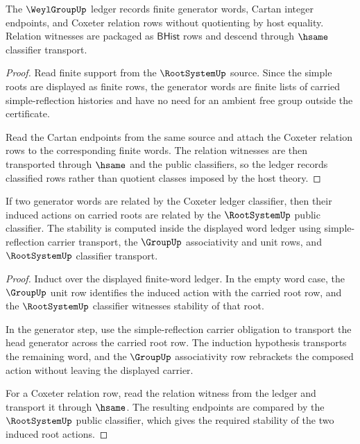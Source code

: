 \begin{theorem}
\label{thm:weylgroup-coxeter-ledger-obligation}
The $\WeylGroupUp$ ledger records finite generator words, Cartan integer
endpoints, and Coxeter relation rows without quotienting by host equality.
Relation witnesses are packaged as $\mathsf{BHist}$ rows and descend through
$\hsame$ classifier transport.
\end{theorem}
\begin{proof}
Read finite support from the $\RootSystemUp$ source. Since the simple roots
are displayed as finite rows, the generator words are finite lists of carried
simple-reflection histories and have no need for an ambient free group outside
the certificate.

Read the Cartan endpoints from the same source and attach the Coxeter relation
rows to the corresponding finite words. The relation witnesses are then
transported through $\hsame$ and the public classifiers, so the ledger records
classified rows rather than quotient classes imposed by the host theory.
\end{proof}

\begin{theorem}
\label{thm:weylgroup-action-classifier-stability-obligation}
If two generator words are related by the Coxeter ledger classifier, then
their induced actions on carried roots are related by the $\RootSystemUp$
public classifier. The stability is computed inside the displayed word ledger
using simple-reflection carrier transport, the $\GroupUp$ associativity and
unit rows, and $\RootSystemUp$ classifier transport.
\end{theorem}
\begin{proof}
Induct over the displayed finite-word ledger. In the empty word case, the
$\GroupUp$ unit row identifies the induced action with the carried root row,
and the $\RootSystemUp$ classifier witnesses stability of that root.

In the generator step, use the simple-reflection carrier obligation to
transport the head generator across the carried root row. The induction
hypothesis transports the remaining word, and the $\GroupUp$ associativity
row rebrackets the composed action without leaving the displayed carrier.

For a Coxeter relation row, read the relation witness from the ledger and
transport it through $\hsame$. The resulting endpoints are compared by the
$\RootSystemUp$ public classifier, which gives the required stability of the
two induced root actions.
\end{proof}

